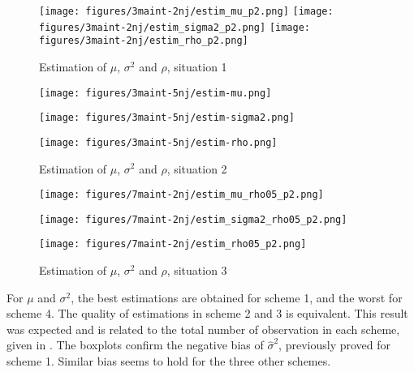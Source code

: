 \begin{figure}[h!]
\begin{multicols}{3}

\texttt{[image: figures/3maint-2nj/estim\_mu\_p2.png]}
\columnbreak
\texttt{[image: figures/3maint-2nj/estim\_sigma2\_p2.png]}  
\columnbreak
\texttt{[image: figures/3maint-2nj/estim\_rho\_p2.png]}  
\end{multicols} 
\vspace{-6mm}
\caption{Estimation of $\mu$, $\sigma^2$ and $\rho$, situation 1}

\label{estim1}
\end{figure}

\begin{figure}[h!]
\begin{multicols}{3}


\texttt{[image: figures/3maint-5nj/estim-mu.png]}\\
\columnbreak

\texttt{[image: figures/3maint-5nj/estim-sigma2.png]}  \\
\columnbreak

\texttt{[image: figures/3maint-5nj/estim-rho.png]}  
\end{multicols}
\vspace{-6mm}
\caption{Estimation of $\mu$, $\sigma^2$ and $\rho$, situation 2}
\label{estim2}
\end{figure} 


\begin{figure}[h!]
\begin{multicols}{3}
\texttt{[image: figures/7maint-2nj/estim\_mu\_rho05\_p2.png]}\\

\columnbreak

\texttt{[image: figures/7maint-2nj/estim\_sigma2\_rho05\_p2.png]} \\

\columnbreak

\texttt{[image: figures/7maint-2nj/estim\_rho05\_p2.png]}
\end{multicols}
\vspace{-6mm}
\caption{Estimation of $\mu$, $\sigma^2$ and $\rho$, situation 3}
\label{estim5}
\end{figure}

For $\mu$ and $\sigma^2$, the best estimations are obtained for scheme 1, and the worst for scheme 4. The quality of estimations in scheme 2 and 3 is equivalent. This result was expected and is related to the total number of observation in each scheme, given in . The boxplots confirm the negative bias of $\hat\sigma^2$, previously proved for scheme 1. Similar bias seems to hold for the three other schemes.

